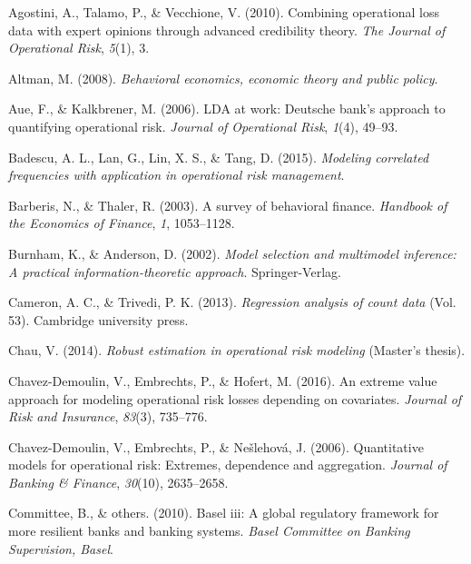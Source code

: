 \documentclass{DissertateUSU}
\begin{document}
\leavevmode\hypertarget{ref-agostini2010combining}{}%
Agostini, A., Talamo, P., \& Vecchione, V. (2010). Combining operational
loss data with expert opinions through advanced credibility theory.
\emph{The Journal of Operational Risk}, \emph{5}(1), 3.

\leavevmode\hypertarget{ref-altman2008behavioral}{}%
Altman, M. (2008). \emph{Behavioral economics, economic theory and
public policy}.

\leavevmode\hypertarget{ref-aue2006lda}{}%
Aue, F., \& Kalkbrener, M. (2006). LDA at work: Deutsche bank's approach
to quantifying operational risk. \emph{Journal of Operational Risk},
\emph{1}(4), 49--93.

\leavevmode\hypertarget{ref-badescu2015modeling}{}%
Badescu, A. L., Lan, G., Lin, X. S., \& Tang, D. (2015). \emph{Modeling
correlated frequencies with application in operational risk management}.

\leavevmode\hypertarget{ref-barberis2003survey}{}%
Barberis, N., \& Thaler, R. (2003). A survey of behavioral finance.
\emph{Handbook of the Economics of Finance}, \emph{1}, 1053--1128.

\leavevmode\hypertarget{ref-Burnham2002}{}%
Burnham, K., \& Anderson, D. (2002). \emph{Model selection and
multimodel inference: A practical information-theoretic approach}.
Springer-Verlag.

\leavevmode\hypertarget{ref-cameron2013regression}{}%
Cameron, A. C., \& Trivedi, P. K. (2013). \emph{Regression analysis of
count data} (Vol. 53). Cambridge university press.

\leavevmode\hypertarget{ref-chau2014robust}{}%
Chau, V. (2014). \emph{Robust estimation in operational risk modeling}
(Master's thesis).

\leavevmode\hypertarget{ref-chavez2016extreme}{}%
Chavez-Demoulin, V., Embrechts, P., \& Hofert, M. (2016). An extreme
value approach for modeling operational risk losses depending on
covariates. \emph{Journal of Risk and Insurance}, \emph{83}(3),
735--776.

\leavevmode\hypertarget{ref-chavez2006quantitative}{}%
Chavez-Demoulin, V., Embrechts, P., \& Nešlehová, J. (2006).
Quantitative models for operational risk: Extremes, dependence and
aggregation. \emph{Journal of Banking \& Finance}, \emph{30}(10),
2635--2658.

\leavevmode\hypertarget{ref-basel2010basel}{}%
Committee, B., \& others. (2010). Basel iii: A global regulatory
framework for more resilient banks and banking systems. \emph{Basel
Committee on Banking Supervision, Basel}.
\end{document}
